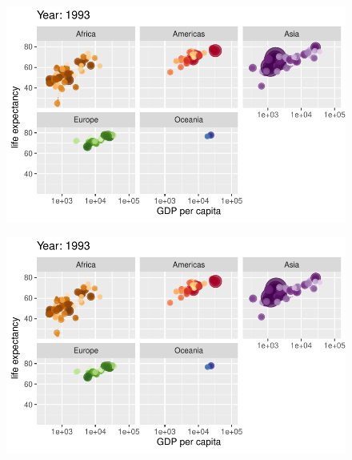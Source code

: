 \documentclass[
  letterpaper,
  DIV=11,
  numbers=noendperiod]{scrartcl}
\begin{document}
\begin{figure}[H]

{\centering \includegraphics{class05_files/figure-pdf/unnamed-chunk-24-74.pdf}

}

\end{figure}

\begin{figure}[H]

{\centering \includegraphics{class05_files/figure-pdf/unnamed-chunk-24-75.pdf}

}

\end{figure}
\end{document}
